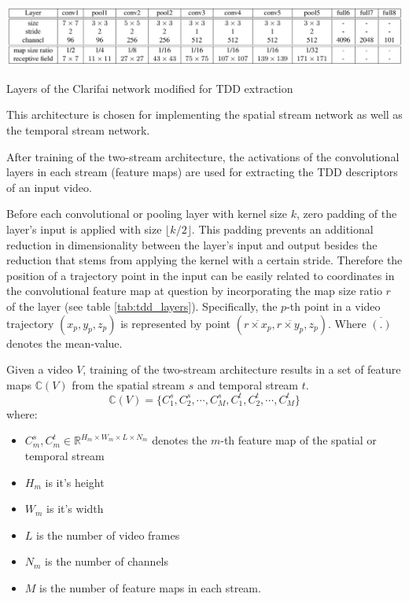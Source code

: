 \begin{table}[H]
    \centering
    \includegraphics[width=\textwidth]{img_deep/tdd_layers}
    \caption{Layers of the Clarifai network modified for TDD extraction \cite{wang_action_2015}}
    \label{tab:tdd_layers}
\end{table}

This architecture is chosen for implementing the spatial stream network as well as the temporal stream network.

After training of the two-stream architecture, the activations of the convolutional layers in each stream (feature maps) are used for extracting the TDD descriptors of an input video.

Before each convolutional or pooling layer with kernel size $k$, zero padding of the layer's input is applied with size $\lfloor k/2 \rfloor$.
This padding prevents an additional reduction in dimensionality between the layer's input and output besides the reduction that stems from applying the kernel with a certain stride.
Therefore the position of a trajectory point in the input can be easily related to coordinates in the convolutional feature map at question by incorporating the map size ratio $r$ of the layer (see table \ref{tab:tdd_layers}).
Specifically, the $p$-th point in a video trajectory $(x_p, y_p, z_p)$ is represented by point $(\overline{r \times x_p}, \overline{r \times y_p}, z_p)$.
Where $\overline{(.)}$ denotes the mean-value.

Given a video $V$, training of the two-stream architecture results in a set of feature maps $\mathbb{C}(V)$ from the spatial stream $s$ and temporal stream $t$.
\begin{equation*}
    \mathbb{C}(V) = \{C_1^s, C_2^s, \cdots, C_M^s, C_1^t, C_2^t, \cdots, C_M^t\}
\end{equation*}
where:
\begin{itemize}
    \item $C_m^s, C_m^t \in \mathbb{R}^{H_m \times W_m \times L \times N_m}$ denotes the $m$-th feature map of the spatial or temporal stream
    \item $H_m$ is it's height
    \item $W_m$ is it's width
    \item $L$ is the number of video frames
    \item $N_m$ is the number of channels
    \item $M$ is the number of feature maps in each stream.
\end{itemize}

